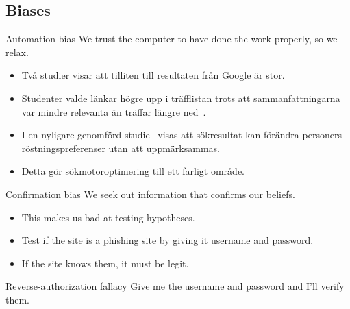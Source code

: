 \subsection{Biases}

\begin{frame}
  \begin{block}{Automation bias}
    We trust the computer to have done the work properly, so we relax.
  \end{block}
  \begin{example}
    \begin{itemize}
      \item Två studier visar att tilliten till resultaten från Google är stor.

      \item Studenter valde länkar högre upp i träfflistan trots att 
        sammanfattningarna var mindre relevanta än träffar längre 
        ned~\cite{Pan2007igw}.

      \item I en nyligare genomförd studie~\cite{Epstein2013dar} visas att 
        sökresultat kan förändra personers röstningspreferenser utan att 
        uppmärksammas.

      \item Detta gör sökmotoroptimering till ett farligt område.

    \end{itemize}
  \end{example}
\end{frame}

\begin{frame}
  \begin{block}{Confirmation bias}
    We seek out information that confirms our beliefs.
  \end{block}

  \pause{}

  \begin{example}
    \begin{itemize}
      \item This makes us bad at testing hypotheses.
      \item Test if the site is a phishing site by giving it username and 
        password.
      \item If the site knows them, it must be legit.
    \end{itemize}
  \end{example}

  \pause{}

  \begin{block}{Reverse-authorization fallacy}
    Give me the username and password and I'll verify them.
  \end{block}
\end{frame}

